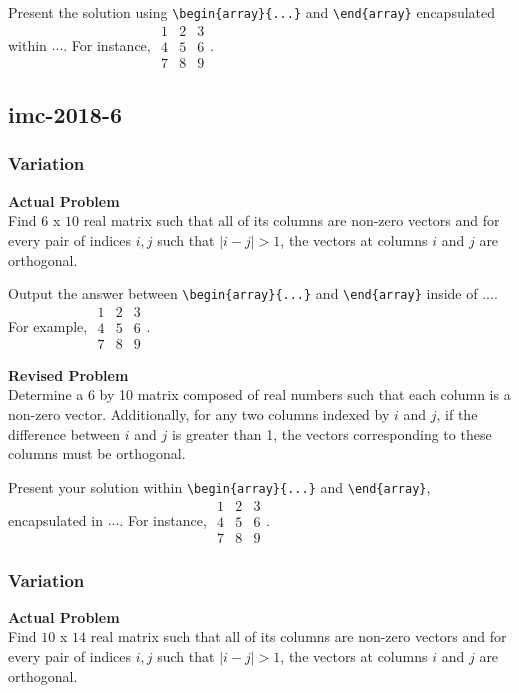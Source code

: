 Present the solution using \verb|\begin{array}{...}| and \verb|\end{array}| encapsulated within $\boxed{...}$. For instance, $\boxed{\begin{array}{ccc}1 & 2 & 3 \\ 4 & 5 & 6 \\ 7 & 8 & 9\end{array}}$.

\subsection{imc-2018-6}
\subsubsection{Variation}
\textbf{Actual Problem}\\
Find $6$ x $10$ real matrix such that all of its columns are non-zero vectors and for every pair of indices $i, j$ such that $|i - j| > 1$, the vectors at columns $i$ and $j$ are orthogonal.

Output the answer between \verb|\begin{array}{...}| and \verb|\end{array}| inside of $\boxed{...}$. For example, $\boxed{\begin{array}{ccc}1 & 2 & 3 \\ 4 & 5 & 6 \\ 7 & 8 & 9\end{array}}$.

\textbf{Revised Problem}\\
Determine a 6 by 10 matrix composed of real numbers such that each column is a non-zero vector. Additionally, for any two columns indexed by $i$ and $j$, if the difference between $i$ and $j$ is greater than 1, the vectors corresponding to these columns must be orthogonal.

Present your solution within \verb|\begin{array}{...}| and \verb|\end{array}|, encapsulated in $\boxed{...}$. For instance, $\boxed{\begin{array}{ccc}1 & 2 & 3 \\ 4 & 5 & 6 \\ 7 & 8 & 9\end{array}}$.

\subsubsection{Variation}
\textbf{Actual Problem}\\
Find $10$ x $14$ real matrix such that all of its columns are non-zero vectors and for every pair of indices $i, j$ such that $|i - j| > 1$, the vectors at columns $i$ and $j$ are orthogonal.

